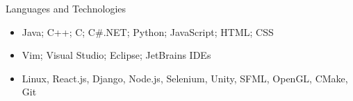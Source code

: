 \documentclass[]{mcdowellcv}
\begin{document}
	\begin{cvsection}{Languages and Technologies}
		\begin{cvsubsection}{}{}{}	
			\begin{itemize}
				\item Java; C++; C; C\#.NET; Python; JavaScript; HTML; CSS
				\item Vim; Visual Studio; Eclipse; JetBrains IDEs
                \item Linux, React.js, Django, Node.js, Selenium, Unity, SFML, OpenGL, CMake, Git
			\end{itemize}
		\end{cvsubsection}
	\end{cvsection}
	
\end{document}
